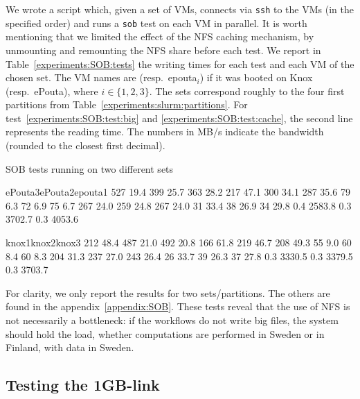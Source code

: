 We wrote a script which, given a set of VMs, connects via \texttt{ssh}
to the VMs (in the specified order) and runs a \texttt{sob} test on
each VM in parallel.
%
It is worth mentioning that we limited the effect of the NFS caching
mechanism, by unmounting and remounting the NFS share before each
test.
%
We report in Table~\ref{experiments:SOB:tests} the writing times for
each test and each VM of the chosen set.
%
The VM names are  (resp.\ epouta$_i$) if it was
booted on Knox (resp.\ ePouta), where $i\in\{1,2,3\}$.
%
The sets correspond roughly to the four first partitions from
Table~\ref{experiments:slurm:partitions}.
%
For test~\ref{experiments:SOB:test:big} and
\ref{experiments:SOB:test:cache}, the second line represents the
reading time.
%
The numbers in MB/s indicate the bandwidth (rounded to the closest
first decimal).

\begin{table}[ht]%
\caption{SOB tests running on two different sets}
\label{experiments:SOB:tests}
\resultpartition%
{{ePouta3}{ePouta2}{epouta1}}%
{{ 527 }{ 19.4   }{ 399 }{ 25.7   }{ 363 }{ 28.2   }}%
{{ 217 }{ 47.1   }{ 300 }{ 34.1   }{ 287 }{ 35.6   }}%
{{  79 }{ 6.3    }{  72 }{ 6.9    }{  75 }{ 6.7    }}%
{{ 267 }{ 24.0   }{ 259 }{ 24.8   }{ 267 }{ 24.0   }}%
{{  31 }{ 33.4   }{  38 }{ 26.9   }{  34 }{ 29.8   }}%
{{ 0.4 }{ 2583.8 }{ 0.3 }{ 3702.7 }{ 0.3 }{ 4053.6 }}

\resultpartition%
{{knox1}{knox2}{knox3}}%
{{ 212 }{ 48.4   }{ 487 }{ 21.0   }{ 492 }{ 20.8   }}%
{{ 166 }{ 61.8   }{ 219 }{ 46.7   }{ 208 }{ 49.3   }}%
{{  55 }{ 9.0    }{  60 }{ 8.4    }{  60 }{ 8.3    }}%
{{ 204 }{ 31.3   }{ 237 }{ 27.0   }{ 243 }{ 26.4   }}%
{{  26 }{ 33.7   }{  39 }{ 26.3   }{  37 }{ 27.8   }}%
{{ 0.3 }{ 3330.5 }{ 0.3 }{ 3379.5 }{ 0.3 }{ 3703.7 }}
\end{table}

For clarity, we only report the results for two sets/partitions. The
others are found in the appendix~\ref{appendix:SOB}. These tests
reveal that the use of NFS is not necessarily a bottleneck: if the
workflows do not write big files, the system should hold the load,
whether computations are performed in Sweden or in Finland, with data
in Sweden.

\subsection{Testing the 1GB-link}
\label{section:experiments:link}


